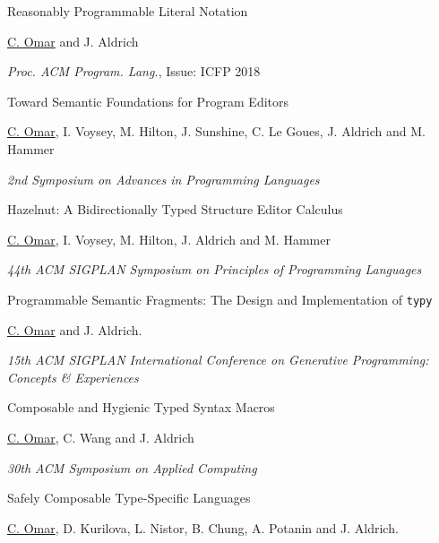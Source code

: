 \documentclass[10pt,letterpaper]{article}
\renewenvironment{itemize}{
  \begin{list}{}{
    \setlength{\leftmargin}{1.25em}
    \setlength{\itemsep}{0.25em}
    \setlength{\parskip}{0pt}
    \setlength{\parsep}{0.2em}
  }
}{
  \end{list}
}
\begin{document}
\begin{enumerate}[leftmargin=*, labelindent=6.5em, font=\bfseries]
  \item[ICFP 2018] {Reasonably Programmable Literal Notation}
        \begin{itemize}
          \item \underline{C. Omar} and J. Aldrich
          \item \textit{Proc. ACM Program. Lang.}, Issue: ICFP 2018
        \end{itemize}
  \item[SNAPL 2018] Toward Semantic Foundations for Program Editors
        \begin{itemize}
          \item \underline{C. Omar}, I. Voysey, M. Hilton, J. Sunshine, C. Le Goues, J. Aldrich and M. Hammer
          \item \textit{2nd Symposium on Advances in Programming Languages} 
        \end{itemize}
  \item[POPL 2017] {Hazelnut: A Bidirectionally Typed Structure Editor Calculus}
        \begin{itemize}
          \item \underline{C. Omar}, I. Voysey, M. Hilton, J. Aldrich and M. Hammer
          \item \textit{44th ACM SIGPLAN Symposium on Principles of Programming Languages} 
        \end{itemize}
  \item[GPCE 2016] {Programmable Semantic Fragments: The Design and Implementation of \texttt{typy}}
        \begin{itemize}
          \item \underline{C. Omar} and J. Aldrich.
          \item \textit{15th ACM SIGPLAN International Conference on Generative Programming: Concepts \& Experiences}
        \end{itemize}
  \item[SAC 2015] Composable and Hygienic Typed Syntax Macros
        \begin{itemize}
          \item \underline{C. Omar}, C. Wang and J. Aldrich
          \item \textit{30th ACM Symposium on Applied Computing}
        \end{itemize}
  \item[ECOOP 2014] {Safely Composable Type-Specific Languages}
        \begin{itemize}
          \item \underline{C. Omar}, D. Kurilova, L. Nistor, B. Chung, A. Potanin and J. Aldrich.

\end{itemize}
\end{enumerate}
\end{document}
